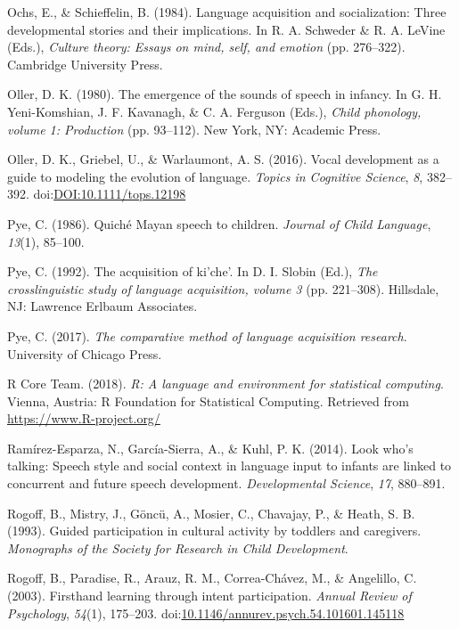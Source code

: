 \documentclass[floatsintext,man]{apa6}
\theoremstyle{definition}
\theoremstyle{definition}
\theoremstyle{definition}
\theoremstyle{remark}
\begin{document}
\hypertarget{ref-ochs1984language}{}
Ochs, E., \& Schieffelin, B. (1984). Language acquisition and
socialization: Three developmental stories and their implications. In R.
A. Schweder \& R. A. LeVine (Eds.), \emph{Culture theory: Essays on
mind, self, and emotion} (pp. 276--322). Cambridge University Press.

\hypertarget{ref-oller1980emergence}{}
Oller, D. K. (1980). The emergence of the sounds of speech in infancy.
In G. H. Yeni-Komshian, J. F. Kavanagh, \& C. A. Ferguson (Eds.),
\emph{Child phonology, volume 1: Production} (pp. 93--112). New York,
NY: Academic Press.

\hypertarget{ref-oller2016vocal}{}
Oller, D. K., Griebel, U., \& Warlaumont, A. S. (2016). Vocal
development as a guide to modeling the evolution of language.
\emph{Topics in Cognitive Science}, \emph{8}, 382--392.
doi:\href{https://doi.org/DOI:10.1111/tops.12198}{DOI:10.1111/tops.12198}

\hypertarget{ref-pye1986quiche}{}
Pye, C. (1986). Quiché Mayan speech to children. \emph{Journal of Child
Language}, \emph{13}(1), 85--100.

\hypertarget{ref-pye1992acquisition}{}
Pye, C. (1992). The acquisition of ki'che'. In D. I. Slobin (Ed.),
\emph{The crosslinguistic study of language acquisition, volume 3} (pp.
221--308). Hillsdale, NJ: Lawrence Erlbaum Associates.

\hypertarget{ref-pye2017comparative}{}
Pye, C. (2017). \emph{The comparative method of language acquisition
research}. University of Chicago Press.

\hypertarget{ref-R-base}{}
R Core Team. (2018). \emph{R: A language and environment for statistical
computing}. Vienna, Austria: R Foundation for Statistical Computing.
Retrieved from \url{https://www.R-project.org/}

\hypertarget{ref-ramirezesparza2014look}{}
Ramírez-Esparza, N., García-Sierra, A., \& Kuhl, P. K. (2014). Look
who's talking: Speech style and social context in language input to
infants are linked to concurrent and future speech development.
\emph{Developmental Science}, \emph{17}, 880--891.

\hypertarget{ref-rogoff1993guided}{}
Rogoff, B., Mistry, J., Göncü, A., Mosier, C., Chavajay, P., \& Heath,
S. B. (1993). Guided participation in cultural activity by toddlers and
caregivers. \emph{Monographs of the Society for Research in Child
Development}.

\hypertarget{ref-rogoff2003firsthand}{}
Rogoff, B., Paradise, R., Arauz, R. M., Correa-Chávez, M., \& Angelillo,
C. (2003). Firsthand learning through intent participation. \emph{Annual
Review of Psychology}, \emph{54}(1), 175--203.
doi:\href{https://doi.org/10.1146/annurev.psych.54.101601.145118}{10.1146/annurev.psych.54.101601.145118}
\end{document}
